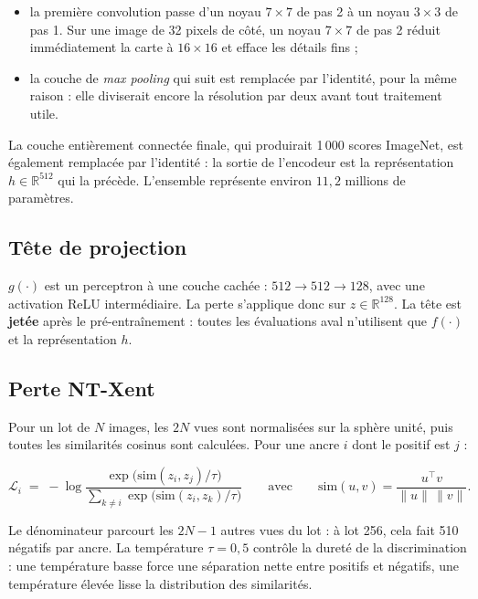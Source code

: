 \documentclass[11pt,a4paper]{article}
\begin{document}
\begin{itemize}
\item la première convolution passe d'un noyau $7\times7$ de pas 2 à un noyau $3\times3$ de
pas 1. Sur une image de 32 pixels de côté, un noyau $7\times7$ de pas 2 réduit
immédiatement la carte à $16\times16$ et efface les détails fins ;
\item la couche de \emph{max pooling} qui suit est remplacée par l'identité, pour la même
raison : elle diviserait encore la résolution par deux avant tout traitement utile.
\end{itemize}

La couche entièrement connectée finale, qui produirait 1\,000 scores ImageNet, est également
remplacée par l'identité : la sortie de l'encodeur est la représentation
$h \in \mathbb{R}^{512}$ qui la précède. L'ensemble représente environ $11{,}2$ millions de
paramètres.

\subsection{Tête de projection}

$g(\cdot)$ est un perceptron à une couche cachée : $512 \rightarrow 512 \rightarrow 128$,
avec une activation ReLU intermédiaire. La perte s'applique donc sur $z \in \mathbb{R}^{128}$.
La tête est \textbf{jetée} après le pré-entraînement : toutes les évaluations aval
n'utilisent que $f(\cdot)$ et la représentation $h$.

\subsection{Perte NT-Xent}

Pour un lot de $N$ images, les $2N$ vues sont normalisées sur la sphère unité, puis toutes
les similarités cosinus sont calculées. Pour une ancre $i$ dont le positif est $j$ :

\begin{equation}
\mathcal{L}_i \;=\; -\log
\frac{\exp\!\big(\mathrm{sim}(z_i, z_j) / \tau\big)}
     {\sum_{k \neq i} \exp\!\big(\mathrm{sim}(z_i, z_k) / \tau\big)}
\qquad\text{avec}\qquad
\mathrm{sim}(u,v) = \frac{u^{\top} v}{\lVert u\rVert\,\lVert v\rVert}.
\label{eq:ntxent}
\end{equation}

Le dénominateur parcourt les $2N - 1$ autres vues du lot : à lot 256, cela fait 510 négatifs
par ancre. La température $\tau = 0{,}5$ contrôle la dureté de la discrimination : une
température basse force une séparation nette entre positifs et négatifs, une température
élevée lisse la distribution des similarités.
\end{document}
